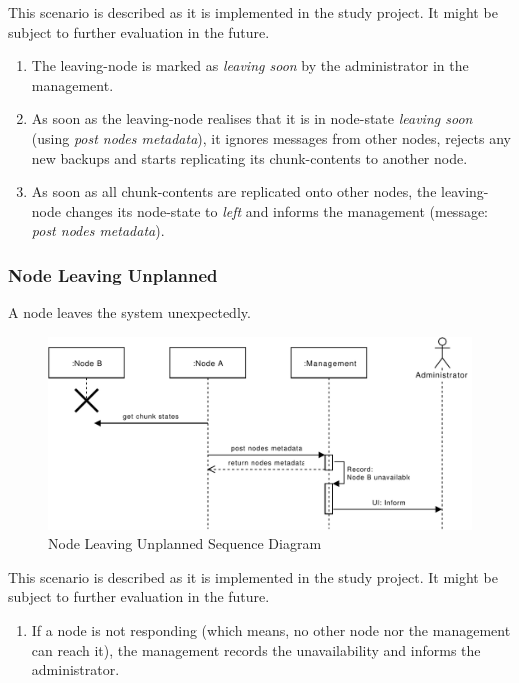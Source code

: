 This scenario is described as it is implemented in the study project. It might be subject to further evaluation in the future.

\begin{enumerate}
    \item The \gls{leaving-node} is marked as \emph{leaving soon} by the \gls{administrator} in the \gls{management}.
    \item As soon as the \gls{leaving-node} realises that it is in \gls{node-state} \emph{leaving soon} (using \emph{post nodes metadata}), it ignores messages from other \glspl{node}, rejects any new backups and starts replicating its \glspl{chunk-content} to another \gls{node}.
    \item As soon as all \glspl{chunk-content} are replicated onto other \glspl{node}, the \gls{leaving-node} changes its \gls{node-state} to \emph{left} and informs the \gls{management} (message: \emph{post nodes metadata}).
\end{enumerate}

\subsubsection{Node Leaving Unplanned}\label{sec:scenario-node-leave-unplanned}
A \gls{node} leaves the \gls{system} unexpectedly.

\begin{figure}[h]
    \centering
    \includegraphics[width=\linewidth]{resources/node_leaving_unplanned.pdf}
    \caption{Node Leaving Unplanned Sequence Diagram}
    \label{fig:node-leave-unplanned}
\end{figure}

This scenario is described as it is implemented in the study project. It might be subject to further evaluation in the future.

\begin{enumerate}
    \item If a \gls{node} is not responding (which means, no other \gls{node} nor the \gls{management} can reach it), the \gls{management} records the unavailability and informs the \gls{administrator}.
\end{enumerate}

